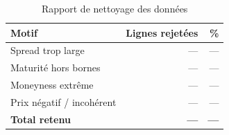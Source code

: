\begin{table}[H]
  \centering
  \caption{Rapport de nettoyage des données}
  \begin{tabular}{lrr}
    \toprule
    Motif & Lignes rejetées & \% \\
    \midrule
    Spread trop large & --- & --- \\
    Maturité hors bornes & --- & --- \\
    Moneyness extrême & --- & --- \\
    Prix négatif / incohérent & --- & --- \\
    \midrule
    \textbf{Total retenu} & \textbf{---} & \textbf{---} \\
    \bottomrule
  \end{tabular}
  \label{tab:nettoyage}
\end{table}

